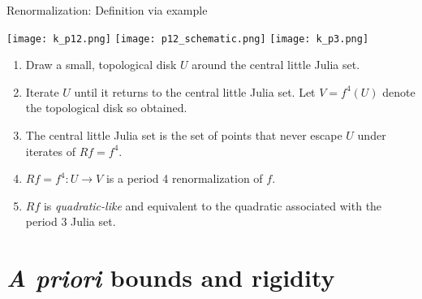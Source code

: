 \documentclass{beamer}
\begin{document}
\begin{frame}{Renormalization: Definition via example}
\begin{center}
    \texttt{[image: k\_p12.png]}
    \hspace{5pt}
    \texttt{[image: p12\_schematic.png]}
    \hspace{5pt}
    \texttt{[image: k\_p3.png]}
\end{center}
\begin{enumerate}
    \item Draw a small, topological disk $U$ around the central little Julia set.
    \item Iterate $U$ until it returns to the central little Julia set. Let $V=f^4(U)$ denote the topological disk so obtained.
    \item The central little Julia set is the set of points that never escape $U$ under iterates of $Rf=f^4$.
    \item $Rf=f^4:U\rightarrow V$ is a period 4 renormalization of $f$.
    \item  $Rf$ is \emph{quadratic-like} and equivalent to the quadratic associated with the period 3 Julia set.
\end{enumerate}
\end{frame}

\section{\textit{A priori} bounds and rigidity}
\end{document}
